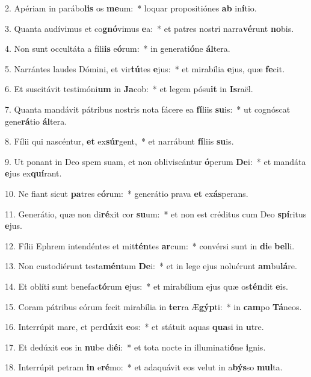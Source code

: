 2. Apériam in parábo\textbf{lis} os \textbf{me}um:~*  loquar propositiónes \textbf{ab} in\textbf{í}tio.\

3. Quanta audívimus et co\textbf{gnó}vimus \textbf{e}a:~*  et patres nostri narra\textbf{vé}runt \textbf{no}bis.\

4. Non sunt occultáta a fíli\textbf{is} e\textbf{ó}rum:~*  in generati\textbf{ó}ne \textbf{ál}tera.\

5. Narrántes laudes Dómini, et vir\textbf{tú}tes \textbf{e}jus:~*  et mirabília \textbf{e}jus, quæ \textbf{fe}cit.\

6. Et suscitávit testimóni\textbf{um} in \textbf{Ja}cob:~*  et legem pósu\textbf{it} in \textbf{Is}raël.\

7. Quanta mandávit pátribus nostris nota fácere ea \textbf{fí}liis \textbf{su}is:~*  ut cognóscat gene\textbf{rá}tio \textbf{ál}tera.\

8. Fílii qui nascéntur, \textbf{et} ex\textbf{súr}gent,~*  et narrábunt \textbf{fí}liis \textbf{su}is.\

9. Ut ponant in Deo spem suam, et non obliviscántur \textbf{ó}perum \textbf{De}i:~*  et mandáta \textbf{e}jus ex\textbf{quí}rant.\

10. Ne fiant sicut \textbf{pa}tres e\textbf{ó}rum:~*  generátio prava \textbf{et} ex\textbf{ás}perans.\

11. Generátio, quæ non di\textbf{ré}xit cor \textbf{su}um:~*  et non est créditus cum Deo \textbf{spí}ritus \textbf{e}jus.\

12. Fílii Ephrem intendéntes et mit\textbf{tén}tes \textbf{ar}cum:~*  convérsi sunt in \textbf{di}e \textbf{bel}li.\

13. Non custodiérunt testa\textbf{mén}tum \textbf{De}i:~*  et in lege ejus noluérunt \textbf{am}bu\textbf{lá}re.\

14. Et oblíti sunt benefac\textbf{tó}rum \textbf{e}jus:~*  et mirabílium ejus quæ os\textbf{tén}dit \textbf{e}is.\

15. Coram pátribus eórum fecit mirabília in \textbf{ter}ra Æ\textbf{gýp}ti:~*  in \textbf{cam}po \textbf{Tá}neos.\

16. Interrúpit mare, et per\textbf{dú}xit \textbf{e}os:~*  et státuit aquas \textbf{qua}si in \textbf{u}tre.\

17. Et dedúxit eos in \textbf{nu}be di\textbf{é}i:~*  et tota nocte in illuminati\textbf{ó}ne \textbf{i}gnis.\

18. Interrúpit petram \textbf{in} e\textbf{ré}mo:~*  et adaquávit eos velut in a\textbf{býs}so \textbf{mul}ta.\

